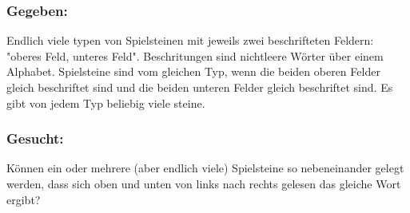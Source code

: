 \subsubsection*{Gegeben: } Endlich viele typen von Spielsteinen mit jeweils zwei beschrifteten Feldern: "oberes Feld, unteres Feld". Beschritungen sind nichtleere Wörter über einem Alphabet. Spielsteine sind vom gleichen Typ, wenn die beiden oberen Felder gleich beschriftet sind und die beiden unteren Felder gleich beschriftet sind. Es gibt von jedem Typ beliebig viele steine. 

\subsubsection*{Gesucht: }Können ein oder mehrere (aber endlich viele) Spielsteine so nebeneinander gelegt werden, dass sich oben und unten von links nach rechts gelesen das gleiche Wort ergibt?
